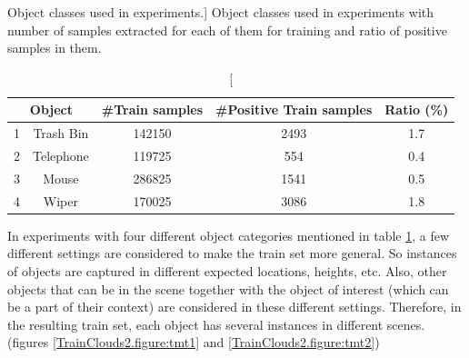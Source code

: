 \begin{table}
\centering
\caption
[Object classes used in experiments.]
{Object classes used in experiments with number of samples extracted for each of them for training and ratio of positive samples in them.}
\label{Objects.table}
\begin{tabular}{|c|c|c|c|c|}
\hline
\multicolumn{2}{|c|}{Object} & \#Train samples & \#Positive Train samples & Ratio (\%) \\
\hline
      1 & Trash Bin & 142150 & 2493 & 1.7 \\
\hline
      2 & Telephone   & 119725 & 554  & 0.4 \\
\hline
      3 & Mouse     & 286825 & 1541 & 0.5 \\
\hline
      4 & Wiper     & 170025 & 3086 & 1.8 \\
\hline

\end{tabular}
\end{table}


In experiments with four different object categories mentioned in table \ref{Objects.table}, a few different settings are considered to make the train set more general. So instances of objects are captured in different expected locations, heights, etc. Also, other objects that can be in the scene together with the object of interest (which can be a part of their context) are considered in these different settings. Therefore, in the resulting train set, each object has several instances in different scenes.
(figures \ref{TrainClouds2.figure:tmt1} and \ref{TrainClouds2.figure:tmt2})

